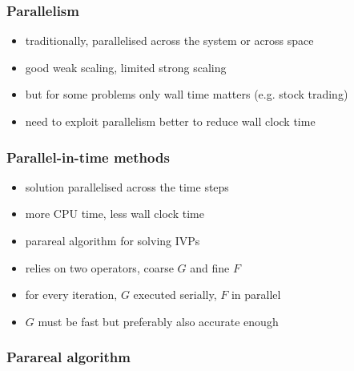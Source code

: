 \documentclass[xcolor=x11names,compress,usenames,dvipsnames,mathsans]{beamer}
\begin{document}
\begin{frame}
\frametitle{Parallelism}
\begin{itemize}
	\item traditionally, parallelised across the system or across space \cite{gear1988}
	\item good weak scaling, limited strong scaling
	\item but for some problems only wall time matters (e.g. stock trading)
	\item need to exploit parallelism better to reduce wall clock time
\end{itemize}
\end{frame}

\begin{frame}
\frametitle{Parallel-in-time methods}
\begin{itemize}
	\item solution parallelised across the time steps
	\item more CPU time, less wall clock time
	\item parareal algorithm \cite{parareal} for solving IVPs
	\item relies on two operators, coarse $G$ and fine $F$
	\item for every iteration, $G$ executed serially, $F$ in parallel
	\item $G$ must be fast but preferably also accurate enough
\end{itemize}
\end{frame}

\begin{frame}
\frametitle{Parareal algorithm}
\begin{figure}[!htb]
\begin{center}
\end{center}
\end{figure}
\end{frame}
\end{document}
